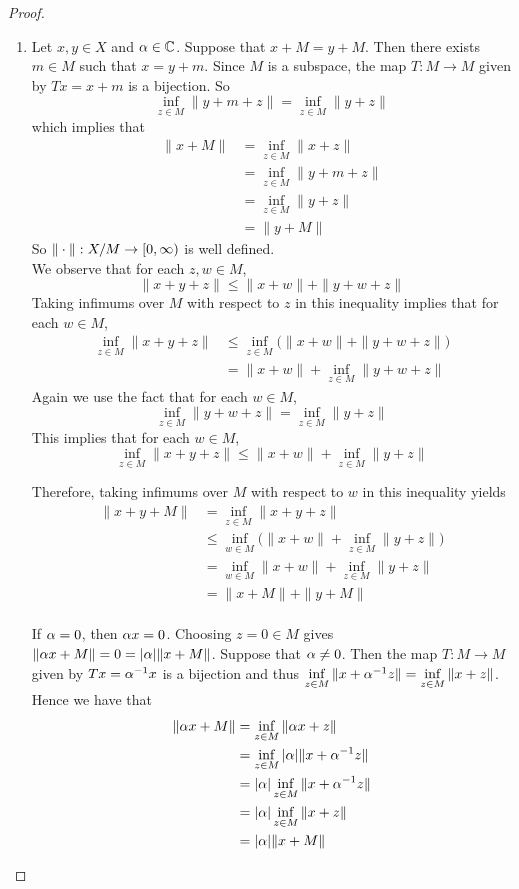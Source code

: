 \documentclass{book}
\begin{document}
	\begin{proof}\
		\begin{enumerate}
			\item  Let $x, y \in X$ and $\alpha \in \mathbb{C}$. Suppose that $x+M =y+M$. Then there exists $m \in M$ such that $x=y+m$. Since $M$ is a subspace, the map $T:M \rightarrow M$ given by $Tx = x+m$ is a bijection. So $$\inf_{z \in M} \|y+m+z \|= \inf_{z \in M} \|y+z \|$$ which implies that 
			\begin{align*}
				\|x +M \|
				&= \inf_{z \in M} \|x+z \|\\
				&= \inf_{z \in M} \|y+m+z \|\\
				&= \inf_{z \in M} \|y+z \|\\
				&= \|y+M \|
			\end{align*} 
			So $\|\cdot \|: X/M \rightarrow [0,\infty)$ is well defined.\vspace{.5cm}\\
			We observe that for each $z,w \in M$, $$\|x+y+z \|\leq \|x+w \|+ \|y+w+z \|$$
			Taking infimums over $M$ with respect to $z$ in this inequality implies that for each $w \in M$,
			\begin{align*}
				\inf_{z \in M}\|x+y+z \|
				&\leq \inf_{z \in M} \bigg( \|x+w \|+ \|y+w+z \|\bigg) \\
				&= \|x+w \|+\inf_{z \in M}\|y+w+z \|
			\end{align*}
			Again we use the fact that for each $w \in M$, $$\inf_{z \in M}\|y+w+z \|= \inf_{z \in M}\|y+z \|$$
			This implies that for each $w \in M$, $$\inf_{z \in M}\|x+y+z \|\leq \|x+w \|+ \inf_{z \in M}\|y+z \|$$
			
			Therefore, taking infimums over $M$ with respect to $w$ in this inequality yields
			\begin{align*}
				\|x+y+M \|
				&= \inf_{z \in M} \|x+y +z \|\\
				& \leq \inf_{w \in M} \bigg(\|x+w \|+ \inf_{z \in M}\|y+z \|\bigg)\\
				&= \inf_{w \in M} \|x+w \|+ \inf_{z \in M}\|y+z \|\\
				&= \|x+M \|+ \|y+M \|
			\end{align*}
			\vspace{.5cm}\\
			If $\alpha =0$, then $\alpha x = 0$. Choosing $z = 0 \in M$ gives $\|\alpha x+M \|=0 = \vert \alpha \vert \|x+M \|$. Suppose that $\alpha \neq 0$. Then the map $T:M \rightarrow M$ given by $Tx = \alpha ^{-1}x$ is a bijection and thus $\inf\limits_{z \in M} \|x+\alpha^{-1}z \|= \inf\limits_{z \in M} \|x+z \|$. Hence we have that
			\begin{align*}
				\|\alpha x+M \|
				&= \inf_{z \in M} \|\alpha x +z \|\\
				&= \inf_{z \in M} \vert \alpha \vert \|x +\alpha^{-1}z \|\\
				&= \vert \alpha \vert \inf_{z \in M}\|x +\alpha^{-1}z \|\\
				&= \vert \alpha \vert \inf_{z \in M}\|x +z \|\\
				&= \vert \alpha \vert \|x+M \|
			\end{align*} 
			

\end{enumerate}
\end{proof}
\end{document}
